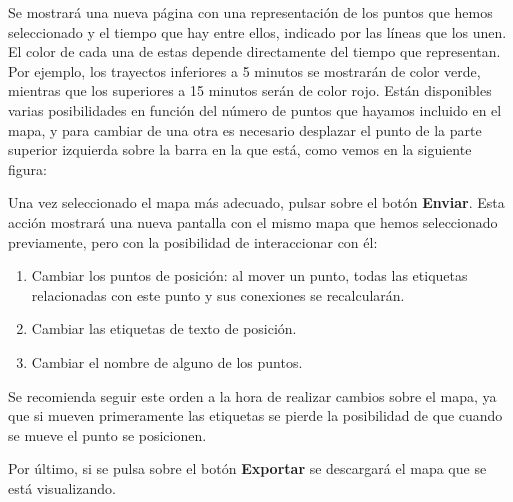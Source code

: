Se mostrará una nueva página con una representación de los puntos que hemos seleccionado y el tiempo que hay entre ellos, indicado por las líneas que los unen. El color de cada una de estas depende directamente del tiempo que representan. Por ejemplo, los trayectos inferiores a 5 minutos se mostrarán de color verde, mientras que los superiores a 15 minutos serán de color rojo. Están disponibles varias posibilidades en función del número de puntos que hayamos incluido en el mapa, y para cambiar de una otra es necesario desplazar el punto de la parte superior izquierda sobre la barra en la que está, como vemos en la siguiente figura:


Una vez seleccionado el mapa más adecuado, pulsar sobre el botón \textbf{Enviar}. Esta acción mostrará una nueva pantalla con el mismo mapa que hemos seleccionado previamente, pero con la posibilidad de interaccionar con él:
\begin{enumerate}
	\item Cambiar los puntos de posición: al mover un punto, todas las etiquetas relacionadas con este punto y sus conexiones se recalcularán.
	\item Cambiar las etiquetas de texto de posición.
	\item Cambiar el nombre de alguno de los puntos.
\end{enumerate}

Se recomienda seguir este orden a la hora de realizar cambios sobre el mapa, ya que si mueven primeramente las etiquetas se pierde la posibilidad de que cuando se mueve el punto se posicionen.


Por último, si se pulsa sobre el botón \textbf{Exportar} se descargará el mapa que se está visualizando.

